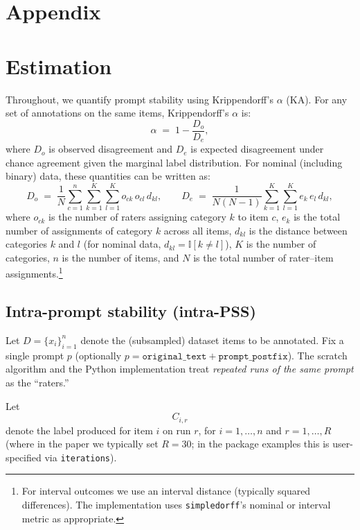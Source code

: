 \setcounter{page}{1}
\renewcommand*{\thepage}{A\arabic{page}}
\appendix
{}

\section*{Appendix} %

\section{Estimation}

Throughout, we quantify prompt stability using Krippendorff's $\alpha$ (KA). For any set of annotations on the same items, Krippendorff's $\alpha$ is:
\[
\alpha \;=\; 1 - \frac{D_o}{D_e},
\]
where $D_o$ is observed disagreement and $D_e$ is expected disagreement under chance agreement given the marginal label distribution. For nominal (including binary) data, these quantities can be written as:
\[
D_o \;=\; \frac{1}{N} \sum_{c=1}^{n} \sum_{k=1}^{K} \sum_{l=1}^{K} o_{ck}\, o_{cl}\, d_{kl},
\qquad
D_e \;=\; \frac{1}{N(N-1)} \sum_{k=1}^{K} \sum_{l=1}^{K} e_{k}\, e_{l}\, d_{kl},
\]
where $o_{ck}$ is the number of raters assigning category $k$ to item $c$, $e_k$ is the total number of assignments of category $k$ across all items, $d_{kl}$ is the distance between categories $k$ and $l$ (for nominal data, $d_{kl}= \mathbb{I}[k\neq l]$), $K$ is the number of categories, $n$ is the number of items, and $N$ is the total number of rater--item assignments.\footnote{For interval outcomes we use an interval distance (typically squared differences). The implementation uses \texttt{simpledorff}'s nominal or interval metric as appropriate.}

\subsection{Intra-prompt stability (intra-PSS)}

Let $D=\{x_i\}_{i=1}^{n}$ denote the (subsampled) dataset items to be annotated. Fix a single prompt $p$ (optionally $p = \texttt{original\_text} + \texttt{prompt\_postfix}$). The scratch algorithm and the Python implementation treat \emph{repeated runs of the same prompt} as the ``raters.''

Let
\[
C_{i,r}
\]
denote the label produced for item $i$ on run $r$, for $i=1,\ldots,n$ and $r=1,\ldots,R$ (where in the paper we typically set $R=30$; in the package examples this is user-specified via \texttt{iterations}).

